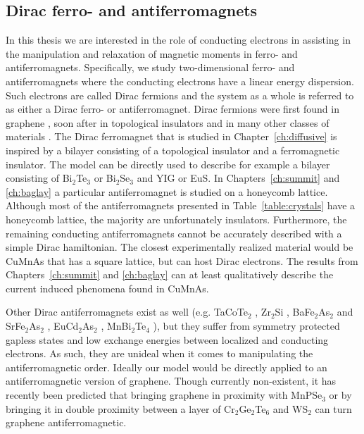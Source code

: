 \subsection{Dirac ferro- and antiferromagnets}
In this thesis we are interested in the role of conducting electrons in assisting in the manipulation and relaxation of magnetic moments in ferro- and antiferromagnets. Specifically, we study two-dimensional ferro- and antiferromagnets where the conducting electrons have a linear energy dispersion. Such electrons are called Dirac fermions and the system as a whole is referred to as either a Dirac ferro- or antiferromagnet. Dirac fermions were first found in graphene \cite{novoselov_electric_2004, novoselov_two-dimensional_2005-1, novoselov_two-dimensional_2005}, soon after in topological insulators \cite{hasan_colloquium_2010, konig_quantum_2008, qi_quantum_2009, cayssol_introduction_2013} and in many other classes of materials \cite{?}. The Dirac ferromagnet that is studied in Chapter~\ref{ch:diffusive} is inspired by a bilayer consisting of a topological insulator and a ferromagnetic insulator. The model can be directly used to describe for example a bilayer consisting of Bi$_2$Te$_3$ or Bi$_2$Se$_3$ and YIG or EuS. In Chapters~\ref{ch:summit} and \ref{ch:baglay} a particular antiferromagnet is studied on a honeycomb lattice. Although most of the antiferromagnets presented in Table~\ref{table:crystals} have a honeycomb lattice, the majority are unfortunately insulators. Furthermore, the remaining conducting antiferromagnets cannot be accurately described with a simple Dirac hamiltonian. The closest experimentally realized material would be CuMnAs that has a square lattice, but can host Dirac electrons. The results from Chapters~\ref{ch:summit} and \ref{ch:baglay} can at least qualitatively describe the current induced phenomena found in CuMnAs.

Other Dirac antiferromagnets exist as well (e.g. TaCoTe$_2$ \cite{wang_antiferromagnetic_2017}, Zr$_2$Si \cite{shao_zr2si_2018}
, BaFe$_2$As$_2$ and SrFe$_2$As$_2$ \cite{chen_two-dimensional_2017}, EuCd$_2$As$_2$ \cite{ma_emergence_2020}, MnBi$_2$Te$_4$ \cite{swatek_gapless_2020}), but they suffer from symmetry protected gapless states and low exchange energies between localized and conducting electrons. As such, they are unideal when it comes to manipulating the antiferromagnetic order. Ideally our model would be directly applied to an antiferromagnetic version of graphene. Though currently non-existent, it has recently been predicted that bringing graphene in proximity with MnPSe$_3$ \cite{hogl_quantum_2020} or by bringing it in double proximity between a layer of Cr$_2$Ge$_2$Te$_6$ and WS$_2$ \cite{zollner_purely_2019} can turn graphene antiferromagnetic.

